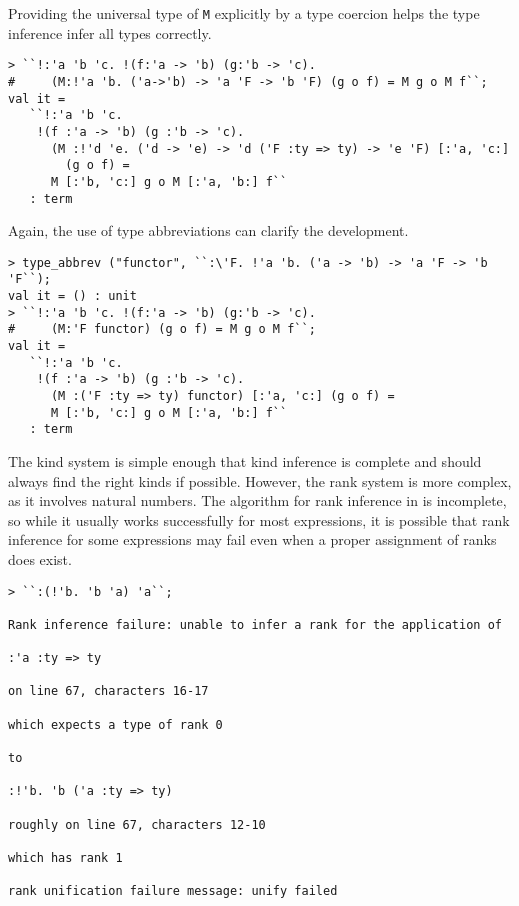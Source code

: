 Providing the universal type of \texttt{M} explicitly by a type coercion
helps the type inference infer all types correctly.
%
\begin{session}
\begin{verbatim}
> ``!:'a 'b 'c. !(f:'a -> 'b) (g:'b -> 'c).
#     (M:!'a 'b. ('a->'b) -> 'a 'F -> 'b 'F) (g o f) = M g o M f``;
val it =
   ``!:'a 'b 'c.
    !(f :'a -> 'b) (g :'b -> 'c).
      (M :!'d 'e. ('d -> 'e) -> 'd ('F :ty => ty) -> 'e 'F) [:'a, 'c:]
        (g o f) =
      M [:'b, 'c:] g o M [:'a, 'b:] f``
   : term
\end{verbatim}
\end{session}

Again, the use of type abbreviations can clarify the development.
%
\begin{session}
\begin{verbatim}
> type_abbrev ("functor", ``:\'F. !'a 'b. ('a -> 'b) -> 'a 'F -> 'b 'F``);
val it = () : unit
> ``!:'a 'b 'c. !(f:'a -> 'b) (g:'b -> 'c).
#     (M:'F functor) (g o f) = M g o M f``;
val it =
   ``!:'a 'b 'c.
    !(f :'a -> 'b) (g :'b -> 'c).
      (M :('F :ty => ty) functor) [:'a, 'c:] (g o f) =
      M [:'b, 'c:] g o M [:'a, 'b:] f``
   : term
\end{verbatim}
\end{session}


The kind system is simple enough that kind inference is complete and should
always find the right kinds if possible.
However, the rank system is more complex, as it involves natural numbers.
The algorithm for rank inference in \HOLW{} is incomplete,
so while it usually works successfully for most 
expressions,
it 
is possible that rank inference for some expressions may fail
even when a proper assignment of ranks does exist.
%
\begin{session}
\begin{verbatim}
> ``:(!'b. 'b 'a) 'a``;

Rank inference failure: unable to infer a rank for the application of

:'a :ty => ty

on line 67, characters 16-17

which expects a type of rank 0

to

:!'b. 'b ('a :ty => ty)

roughly on line 67, characters 12-10

which has rank 1

rank unification failure message: unify failed
\end{verbatim}
\end{session}

